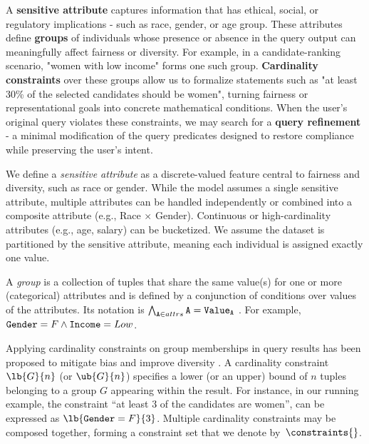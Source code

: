 A \textbf{sensitive attribute} captures information that has ethical, social, or regulatory implications - such as race, gender, or age group. These attributes define \textbf{groups} of individuals whose presence or absence in the query output can meaningfully affect fairness or diversity. For example, in a candidate-ranking scenario, "women with low income" forms one such group. \textbf{Cardinality constraints} over these groups allow us to formalize statements such as "at least 30\% of the selected candidates should be women", turning fairness or representational goals into concrete mathematical conditions. When the user's original query violates these constraints, we may search for a \textbf{query refinement} - a minimal modification of the query predicates designed to restore compliance while preserving the user’s intent.





\begin{definition}\label{def:sensitive-attr}  
We define a {\it sensitive attribute} as a discrete-valued feature central to fairness and diversity, such as race or gender. While the model assumes a single sensitive attribute, multiple attributes can be handled independently or combined into a composite attribute (e.g., Race $\times$ Gender). Continuous or high-cardinality attributes (e.g., age, salary) can be bucketized. We assume the dataset is partitioned by the sensitive attribute, meaning each individual is assigned exactly one value.
\end{definition}

\begin{definition}\label{def:group}  
    A {\it group} is a collection of tuples that share the same value(s) for one or more (categorical) attributes and is defined by a conjunction of conditions over values of the attributes. Its notation is $\bigwedge_{{\tt A} \in attrs} {\tt A} = {\tt Value_{A}}$ . For example, ${\tt Gender} = F \wedge {\tt Income} = Low$.
\end{definition}

\begin{definition}\label{def:card-constraint} 
Applying cardinality constraints on group memberships in query results has been proposed to mitigate bias and improve diversity \cite{MLJ22, ERICA}.
A cardinality constraint $\lb{G}{n}$ (or $\ub{G}{n}$) specifies a lower (or an upper) bound of $n$ tuples belonging to a group $G$ appearing within the result. For instance, in our running example, the constraint ``at least $3$ of the candidates are women'', can be expressed as  $\lb{{\tt Gender} = F}{3}$. Multiple cardinality constraints may be composed together, forming a constraint set that we denote by~$\constraints{}$.
\end{definition}

